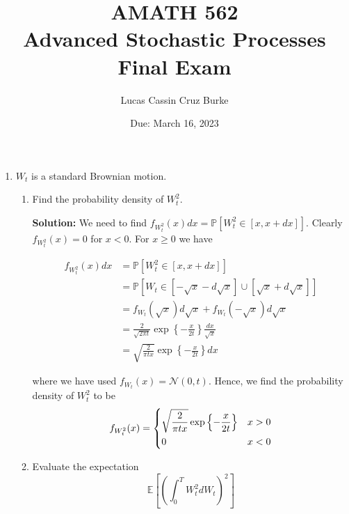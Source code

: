 \documentclass[12pt, a4paper]{article}
\begin{document}
\title{{AMATH 562\\
Advanced Stochastic Processes}\\
{\bf \Huge Final Exam}}

\author{Lucas Cassin Cruz Burke}

\date{Due: March 16, 2023}

\maketitle

\begin{enumerate}
    \item $W_t$ is a standard Brownian motion. 
    
    \begin{enumerate}
        \item Find the probability density of $W_t^2$. 
        
        \textbf{Solution:} We need to find $f_{W_t^2} (x) dx = \mathbb P \left[ W_t^2 \in [x,x+dx] \right]$. Clearly $f_{W_t^2} (x)=0$ for $x<0$. For $x \ge 0$ we have

        \begin{align*}
            f_{W_t^2} (x) dx &= \mathbb P \left[ W_t^2 \in [x,x+dx] \right] \\
            &= \mathbb P \left[ W_t \in [-\sqrt x-d\sqrt x]\cup [\sqrt x + d \sqrt x] \right]\\
            &= f_{W_t}(\sqrt x) d\sqrt x + f_{W_t}(-\sqrt x)d\sqrt x \\
            &= \frac{2}{\sqrt{2 \pi t}} \exp \left\{ - \frac{x}{2t} \right\} \frac{dx}{\sqrt{x}} \\
            &= \sqrt{\frac{2}{\pi t x}} \exp \left\{ - \frac{x}{2t} \right\}dx
        \end{align*}

        where we have used $f_{W_t}(x) = \mathcal N(0,t)$. Hence, we find the probability density of $W_t^2$ to be 
        \begin{align*}
            f_{W_t^2}(x) = \begin{dcases}
                \sqrt{\frac{2}{\pi t x}} \exp \left\{ - \frac{x}{2t} \right\} & x > 0 \\
                0 & x <0
            \end{dcases}
        \end{align*}

        \item Evaluate the expectation $$\mathbb E \left[ \left( \int_0^T W_t^2 dW_t \right)^2 \right]$$


\end{enumerate}
\end{enumerate}
\end{document}

